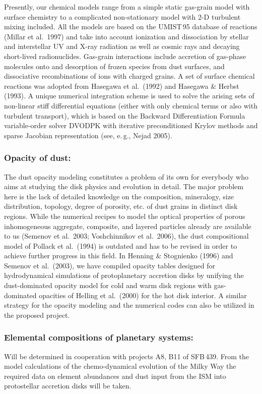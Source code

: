Presently, our chemical models range from a simple static
gas-grain model with surface chemistry to a complicated
non-stationary model with 2-D turbulent mixing included. All the
models are based on the UMIST\,95 database of reactions
(Millar et al.~1997) and take into account ionization and dissociation
by stellar and interstellar UV and X-ray radiation as well as
cosmic rays and decaying short-lived radionuclides. Gas-grain
interactions include accretion of gas-phase molecules onto and
desorption of frozen species from dust surfaces, and dissociative
recombinations of ions with charged grains. A set of surface
chemical reactions was adopted from Hasegawa et al.~(1992) and
Hasegawa \& Herbst (1993). A unique numerical integration scheme is
used to solve the arising sets of non-linear stiff differential
equations (either with only chemical terms or also with turbulent
transport), which is based on the Backward Differentiation Formula
variable-order solver DVODPK with iterative preconditioned Krylov
methods and sparse Jacobian representation (see, e.\,g., Nejad 2005).

\subsubsection{Opacity of dust:}
%
The dust opacity modeling constitutes a problem of its own for
everybody who aims at studying the disk physics and evolution in
detail. The major problem here is the lack of detailed knowledge
on the composition, mineralogy, size distribution, topology,
degree of porosity, etc. of dust grains in distinct disk regions.
While the numerical recipes to model the optical properties of
porous inhomogeneous aggregate, composite, and layered particles
already are available to us (Semenov et al.~2003; Voshchinnikov et
al.~2006), the dust compositional model of Pollack et al.~(1994)
is outdated and has to be revised in order to achieve further
progress in this field. In Henning \& Stognienko (1996) and Semenov
et al.~(2003), we have compiled opacity tables designed for
hydrodynamical simulations of protoplanetary accretion disks by
unifying the dust-dominated opacity model for cold and warm disk
regions with gas-dominated opacities of Helling et al.~(2000) for
the hot disk interior. A similar strategy for the opacity modeling
and the numerical codes can also be utilized in the proposed
project.

%
\subsubsection{Elemental compositions of planetary systems:} Will be
determined in cooperation with projects A8, B11 of SFB\,439. From
the model calculations of the chemo-dynamical evolution of the
Milky Way the required data on element abundances and dust input
from the ISM into protostellar accretion disks will be taken.



